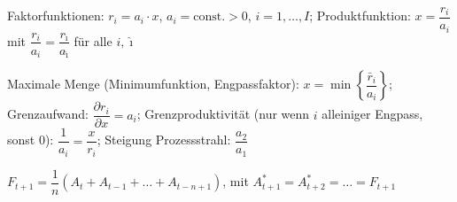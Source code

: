 
Faktorfunktionen: $r_i = a_i \cdot x$, $a_i=\text{const.}>0$, $i=1,\dots,I$; \quad
Produktfunktion: $x = \dfrac{r_i}{a_i}$ mit $\dfrac{r_i}{a_i} = \dfrac{r_{\hat\imath}}{a_{\hat\imath}}$ für alle $i,\hat\imath$

Maximale Menge (Minimumfunktion, Engpassfaktor): $x = \min\left\{ \dfrac{\bar r_i}{a_i} \right\}$; \quad
Grenzaufwand: $\dfrac{\partial r_i}{\partial x} = a_i$; \quad
Grenzproduktivität (nur wenn $i$ alleiniger Engpass, sonst 0): $\dfrac{1}{a_i} = \dfrac{x}{r_i}$; \quad
Steigung Prozessstrahl: $\dfrac{a_2}{a_1}$

$F_{t+1} = \dfrac{1}{n}\left(A_t + A_{t-1} + \dots + A_{t-n+1}\right)$, \; mit $A^{*}_{t+1} = A^{*}_{t+2} = \dots = F_{t+1}$
